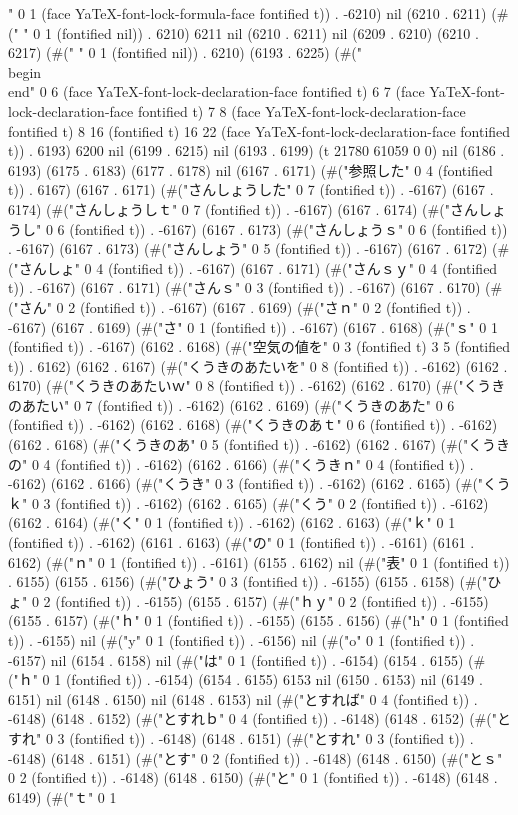 " 0 1 (face YaTeX-font-lock-formula-face fontified t)) . -6210) nil (6210 . 6211) (#("	" 0 1 (fontified nil)) . 6210) 6211 nil (6210 . 6211) nil (6209 . 6210) (6210 . 6217) (#("	" 0 1 (fontified nil)) . 6210) (6193 . 6225) (#("\\begin{}
       \\end{}" 0 6 (face YaTeX-font-lock-declaration-face fontified t) 6 7 (face YaTeX-font-lock-declaration-face fontified t) 7 8 (face YaTeX-font-lock-declaration-face fontified t) 8 16 (fontified t) 16 22 (face YaTeX-font-lock-declaration-face fontified t)) . 6193) 6200 nil (6199 . 6215) nil (6193 . 6199) (t 21780 61059 0 0) nil (6186 . 6193) (6175 . 6183) (6177 . 6178) nil (6167 . 6171) (#("参照した" 0 4 (fontified t)) . 6167) (6167 . 6171) (#("さんしょうした" 0 7 (fontified t)) . -6167) (6167 . 6174) (#("さんしょうしｔ" 0 7 (fontified t)) . -6167) (6167 . 6174) (#("さんしょうし" 0 6 (fontified t)) . -6167) (6167 . 6173) (#("さんしょうｓ" 0 6 (fontified t)) . -6167) (6167 . 6173) (#("さんしょう" 0 5 (fontified t)) . -6167) (6167 . 6172) (#("さんしょ" 0 4 (fontified t)) . -6167) (6167 . 6171) (#("さんｓｙ" 0 4 (fontified t)) . -6167) (6167 . 6171) (#("さんｓ" 0 3 (fontified t)) . -6167) (6167 . 6170) (#("さん" 0 2 (fontified t)) . -6167) (6167 . 6169) (#("さｎ" 0 2 (fontified t)) . -6167) (6167 . 6169) (#("さ" 0 1 (fontified t)) . -6167) (6167 . 6168) (#("ｓ" 0 1 (fontified t)) . -6167) (6162 . 6168) (#("空気の値を" 0 3 (fontified t) 3 5 (fontified t)) . 6162) (6162 . 6167) (#("くうきのあたいを" 0 8 (fontified t)) . -6162) (6162 . 6170) (#("くうきのあたいｗ" 0 8 (fontified t)) . -6162) (6162 . 6170) (#("くうきのあたい" 0 7 (fontified t)) . -6162) (6162 . 6169) (#("くうきのあた" 0 6 (fontified t)) . -6162) (6162 . 6168) (#("くうきのあｔ" 0 6 (fontified t)) . -6162) (6162 . 6168) (#("くうきのあ" 0 5 (fontified t)) . -6162) (6162 . 6167) (#("くうきの" 0 4 (fontified t)) . -6162) (6162 . 6166) (#("くうきｎ" 0 4 (fontified t)) . -6162) (6162 . 6166) (#("くうき" 0 3 (fontified t)) . -6162) (6162 . 6165) (#("くうｋ" 0 3 (fontified t)) . -6162) (6162 . 6165) (#("くう" 0 2 (fontified t)) . -6162) (6162 . 6164) (#("く" 0 1 (fontified t)) . -6162) (6162 . 6163) (#("ｋ" 0 1 (fontified t)) . -6162) (6161 . 6163) (#("の" 0 1 (fontified t)) . -6161) (6161 . 6162) (#("ｎ" 0 1 (fontified t)) . -6161) (6155 . 6162) nil (#("表" 0 1 (fontified t)) . 6155) (6155 . 6156) (#("ひょう" 0 3 (fontified t)) . -6155) (6155 . 6158) (#("ひょ" 0 2 (fontified t)) . -6155) (6155 . 6157) (#("ｈｙ" 0 2 (fontified t)) . -6155) (6155 . 6157) (#("ｈ" 0 1 (fontified t)) . -6155) (6155 . 6156) (#("h" 0 1 (fontified t)) . -6155) nil (#("y" 0 1 (fontified t)) . -6156) nil (#("o" 0 1 (fontified t)) . -6157) nil (6154 . 6158) nil (#("は" 0 1 (fontified t)) . -6154) (6154 . 6155) (#("ｈ" 0 1 (fontified t)) . -6154) (6154 . 6155) 6153 nil (6150 . 6153) nil (6149 . 6151) nil (6148 . 6150) nil (6148 . 6153) nil (#("とすれば" 0 4 (fontified t)) . -6148) (6148 . 6152) (#("とすれｂ" 0 4 (fontified t)) . -6148) (6148 . 6152) (#("とすれ" 0 3 (fontified t)) . -6148) (6148 . 6151) (#("とすれ" 0 3 (fontified t)) . -6148) (6148 . 6151) (#("とす" 0 2 (fontified t)) . -6148) (6148 . 6150) (#("とｓ" 0 2 (fontified t)) . -6148) (6148 . 6150) (#("と" 0 1 (fontified t)) . -6148) (6148 . 6149) (#("ｔ" 0 1 